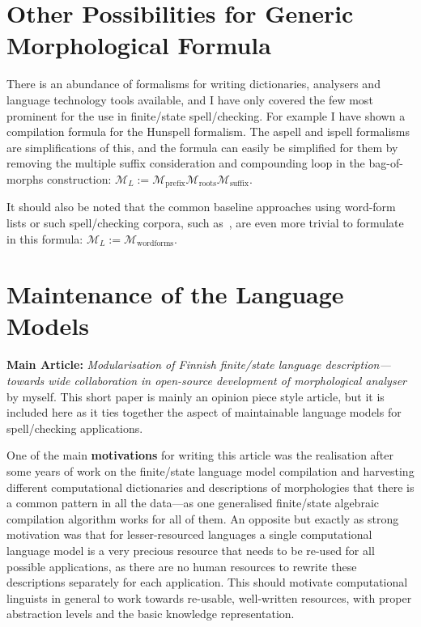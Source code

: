\documentclass[officiallayout]{unihelcompling}
\begin{document}
\section{Other Possibilities for Generic Morphological Formula}
\label{sec:other-lms}

There is an abundance of formalisms for writing dictionaries, analysers and
language technology tools available, and I have only covered the few most
prominent for the use in finite\-/state spell\-/checking. For example I have
shown a compilation formula for the Hunspell formalism. The aspell and ispell
formalisms are simplifications of this, and the formula can easily be
simplified for them by removing the multiple suffix consideration and
compounding loop in the bag-of-morphs construction: $\mathcal{M}_L :=
\mathcal{M}_\mathrm{prefix} \mathcal{M}_\mathrm{roots} \mathcal{M}_\mathrm{suffix}$.

It should also be noted that the common baseline approaches using word-form
lists or such spell\-/checking corpora, such as~\citet{norvig2010howto}, are even
more trivial to formulate in this formula: $\mathcal{M}_L :=
\mathcal{M}_\mathrm{wordforms}$.

\section{Maintenance of the Language Models}
\label{sec:maintenance}

\textbf{Main Article:} \emph{Modularisation of Finnish finite\-/state language 
description—towards wide collaboration in open-source development of
morphological analyser} by myself. This short paper is mainly an opinion
piece style article, but it is included here as it ties together the
aspect of maintainable language models for spell\-/checking applications.

One of the main \textbf{motivations} for writing this article was the
realisation after some years of work on the finite\-/state language model
compilation and harvesting different computational dictionaries and
descriptions of morphologies that there is a common pattern in all the
data---as one generalised finite\-/state algebraic compilation algorithm works
for all of them. An opposite but exactly as strong motivation was that for
lesser-resourced languages a single computational language model is a very
precious resource that needs to be re-used for all possible applications, as
there are no human resources to rewrite these descriptions separately for each
application. This should motivate computational linguists in general to work
towards re-usable, well-written resources, with proper abstraction levels and
the basic knowledge representation.
\end{document}
